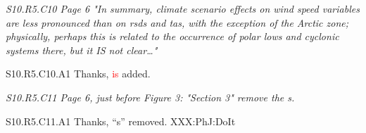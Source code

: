 \documentclass[a4paper,10pt]{article}
\newcommand{\ed}[1]{\textcolor{red}{#1}}
\begin{document}
	\emph{S10.R5.C10 Page 6 "In summary, climate scenario effects on wind speed variables are less pronounced than on rsds and tas, with the exception of the Arctic zone; physically, perhaps this is related to the occurrence of polar lows and cyclonic systems there, but it IS not clear…"}

	S10.R5.C10.A1 Thanks, \ed{is} added.

	\emph{S10.R5.C11 Page 6, just before Figure 3: "Section 3" remove the s.}

	S10.R5.C11.A1 Thanks, ``s'' removed. XXX:PhJ:DoIt

	
	
	
\end{document}
